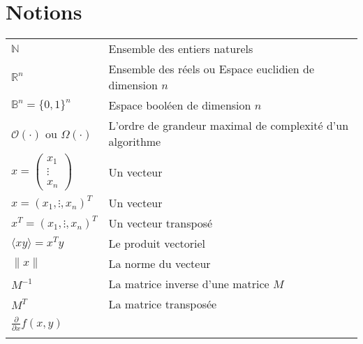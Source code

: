 \chapter*{Notions}

\begin{tabular}{ll}
	$\mathbb{N} $ & Ensemble des entiers naturels\\
	$\mathbb{R}^n $ & Ensemble des réels ou  Espace euclidien de dimension $n$ \\
	$\mathbb{B}^n = \{0,1\}^n $ & Espace booléen de dimension $n$\\
	$\mathcal{O}(\cdot) $ ou $ {\Omega}(\cdot) $ & L'ordre de grandeur maximal de complexité d'un algorithme \\
	
	
	$x = \begin{pmatrix}
		x_1 \\ \vdots \\ x_n 
	\end{pmatrix} $ & Un vecteur\\ 
	$x =  (x_1, \vdots,  x_n)^T$ & Un vecteur \\ 
	$x^T =  (x_1, \vdots,  x_n)^T$ & Un vecteur transposé \\ 
	$ \langle xy\rangle = x^Ty$  & Le produit vectoriel \\ 
	$\parallel x \parallel $ & La norme du vecteur\\
	
	 
	$M^{-1}$ & La matrice inverse d'une matrice $M$\\
	$M^{T}$ & La matrice transposée \\
	
	$\frac{\partial}{\partial x}f(x,y) $ &  \\ 

	
	$ $ & \\ 
	
	
\end{tabular}
